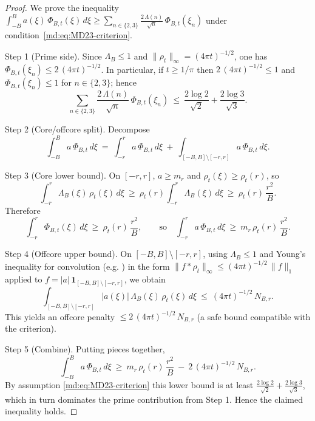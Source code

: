 \begin{proof}
We prove the inequality $\int_{-B}^{B} a(\xi)\,\Phi_{B,t}(\xi)\,d\xi \ge \sum_{n\in\{2,3\}} \frac{2\,\Lambda(n)}{\sqrt n}\,\Phi_{B,t}(\xi_n)$ under condition~\eqref{md:eq:MD23-criterion}.

Step 1 (Prime side). Since $\Lambda_B\le1$ and $\|\rho_t\|_\infty=(4\pi t)^{-1/2}$, one has $\Phi_{B,t}(\xi_n)\le 2\,(4\pi t)^{-1/2}$. In particular, if $t\ge 1/\pi$ then $2\,(4\pi t)^{-1/2}\le1$ and $\Phi_{B,t}(\xi_n)\le1$ for $n\in\{2,3\}$; hence
\begin{equation}\label{eq:MD_2_3_base_interval-formula-10}
 \sum_{n\in\{2,3\}} \frac{2\,\Lambda(n)}{\sqrt n}\,\Phi_{B,t}(\xi_n)\ \le\ \frac{2\log 2}{\sqrt 2}+\frac{2\log 3}{\sqrt 3}.
\end{equation}

Step 2 (Core/off\-core split). Decompose
\begin{equation}\label{eq:MD_2_3_base_interval-formula-12}
 \int_{-B}^{B} a\,\Phi_{B,t}\,d\xi\ =\ \int_{-r}^{r}\! a\,\Phi_{B,t}\,d\xi\ +\ \int_{[-B,B]\setminus[-r,r]}\! a\,\Phi_{B,t}\,d\xi.
\end{equation}

Step 3 (Core lower bound). On $[-r,r]$, $a\ge m_r$ and $\rho_t(\xi)\ge \rho_t(r)$, so
\begin{equation}\label{eq:MD_2_3_base_interval-formula-9}
 \int_{-r}^{r}\!\Lambda_B(\xi)\,\rho_t(\xi)\,d\xi\ \ge\ \rho_t(r)\int_{-r}^{r}\! \Lambda_B(\xi)\,d\xi\ \ge\ \rho_t(r)\,\frac{r^2}{B}.
\end{equation}
Therefore
\begin{equation}\label{eq:MD_2_3_base_interval-formula-8}
 \int_{-r}^{r}\!\Phi_{B,t}(\xi)\,d\xi\ \ge\ \rho_t(r)\,\frac{r^2}{B},\qquad \text{so}\quad \int_{-r}^{r}\! a\,\Phi_{B,t}\,d\xi\ \ge\ m_r\,\rho_t(r)\,\frac{r^2}{B}.
\end{equation}

Step 4 (Off\-core upper bound). On $[-B,B]\setminus[-r,r]$, using $\Lambda_B\le1$ and Young's inequality for convolution (e.g. \cite[Ch.~3]{SteinShakarchi2003}) in the form $\|f*\rho_t\|_\infty\le (4\pi t)^{-1/2}\,\|f\|_1$ applied to $f=|a|\,\mathbf 1_{[-B,B]\setminus[-r,r]}$, we obtain
\begin{equation}\label{eq:MD_2_3_base_interval-lambda-min-1}
 \int_{[-B,B]\setminus[-r,r]}\! |a(\xi)|\,\Lambda_B(\xi)\,\rho_t(\xi)\,d\xi\ \le\ (4\pi t)^{-1/2}\,N_{B,r}.
\end{equation}
This yields an off\-core penalty $\le 2\,(4\pi t)^{-1/2}\,N_{B,r}$ (a safe bound compatible with the criterion).

Step 5 (Combine). Putting pieces together,
\begin{equation}\label{eq:MD_2_3_base_interval-formula-7}
 \int_{-B}^{B} a\,\Phi_{B,t}\,d\xi\ \ge\ m_r\,\rho_t(r)\,\frac{r^2}{B}\ -\ 2\,(4\pi t)^{-1/2}\,N_{B,r}.
\end{equation}
By assumption \eqref{md:eq:MD23-criterion} this lower bound is at least $\frac{2\log 2}{\sqrt 2}+\frac{2\log 3}{\sqrt 3}$, which in turn dominates the prime contribution from Step 1. Hence the claimed inequality holds.
\end{proof}
